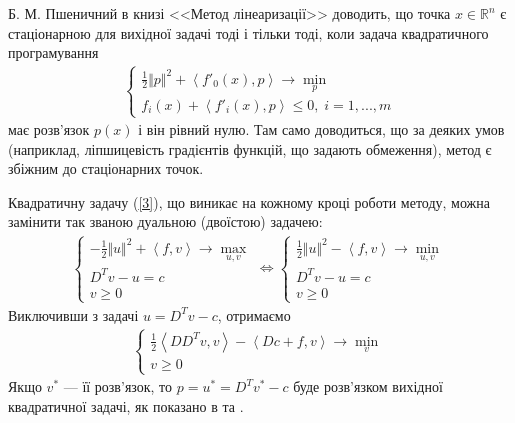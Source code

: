 \documentclass{extreport}
\begin{document}
Б. М. Пшеничний в книзі <<Метод лінеаризації>> \cite{1} доводить, що точка $x\in\mathbb{R}^n$ є стаціонарною для вихідної задачі тоді і тільки тоді, коли
задача квадратичного програмування
\begin{gather}
    \begin{cases}
        \frac{1}{2} \Vert p \Vert^2 + \left<f'_0(x), p\right> \to \underset{p}{\min} \\
        f_i(x) + \left<f'_i(x), p\right> \leq 0, \; i = 1, ..., m
    \end{cases}
\end{gather}
має розв'язок $p(x)$ і він рівний нулю. Там само доводиться, що за деяких умов (наприклад, ліпшицевість градієнтів функцій, що задають обмеження), метод є збіжним
до стаціонарних точок.

Квадратичну задачу (\ref{3}), що виникає на кожному кроці роботи методу, можна замінити так званою дуальною (двоїстою) задачею:
\begin{gather}
    \begin{cases}
        -\frac{1}{2} \Vert u \Vert^2 + \left<f, v\right> \to \underset{u, v}{\max} \\
        D^T v - u = c\\
        v \geq 0
    \end{cases} \Leftrightarrow
    \begin{cases}
        \frac{1}{2} \Vert u\Vert^2 - \left<f, v\right> \to \underset{u, v}{\min} \\
        D^T v - u = c \\
        v \geq 0
    \end{cases}
\end{gather}
Виключивши з задачі $u = D^T v - c$, отримаємо
\begin{gather}\label{non_neg}
    \begin{cases}
        \frac{1}{2}\left<D D^T v, v\right> - \left<D c + f, v \right> \to \underset{v}{\min} \\
        v \geq 0
    \end{cases}
\end{gather}
Якщо $v^*$ --- її розв'язок, то $p = u^* = D^T v^* - c$ буде розв'язком вихідної квадратичної задачі, як показано в \cite{1} та \cite{2}.
\end{document}
